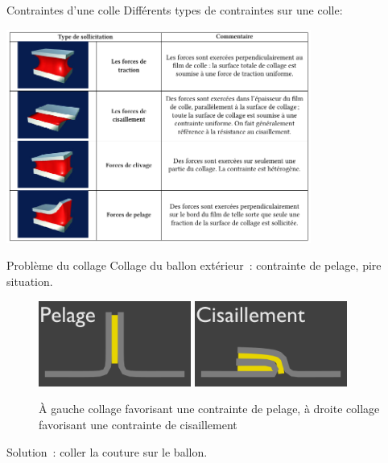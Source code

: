 \begin{frame}{Contraintes d'une colle}
  Différents types de contraintes sur une colle:
  \begin{center}
    \includegraphics[width=10cm]{../Images/colle_contraintes.png}
  \end{center}
\end{frame}

\begin{frame}{Problème du collage}
  Collage du ballon extérieur~: contrainte de pelage, pire situation.
  \begin{figure}
    \centering
    \includegraphics[width=5cm]{../Images/colle_pelage.png}
    \includegraphics[width=5cm]{../Images/colle_cisaillement.png}
    \caption{À gauche collage favorisant une contrainte de pelage, à droite collage favorisant une contrainte de cisaillement}
  \end{figure}
  Solution~: coller la couture sur le ballon.
\end{frame}


